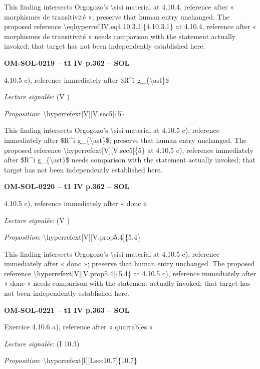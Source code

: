 This finding intersects Orgogozo's \textbackslash{}sisi material at 4.10.4, reference after « morphismes de transitivité »; preserve that human entry unchanged. The proposed reference \textbackslash{}eqhyperref[IV.eq4.10.3.1]\{4.10.3.1\} at 4.10.4, reference after « morphismes de transitivité » needs comparison with the statement actually invoked; that target has not been independently established here.\par
\par\noindent\textbf{OM-SOL-0219 -- t1 IV p.362 -- SOL}\par
4.10.5 c), reference immediately after \$R\textasciicircum{}i g\_\{\textbackslash{}ast\}\$\par
\emph{Lecture signalée}: (V )\par
\emph{Proposition}: \textbackslash{}hyperrefext[V][V.sec5]\{5\}\par
This finding intersects Orgogozo's \textbackslash{}sisi material at 4.10.5 c), reference immediately after \$R\textasciicircum{}i g\_\{\textbackslash{}ast\}\$; preserve that human entry unchanged. The proposed reference \textbackslash{}hyperrefext[V][V.sec5]\{5\} at 4.10.5 c), reference immediately after \$R\textasciicircum{}i g\_\{\textbackslash{}ast\}\$ needs comparison with the statement actually invoked; that target has not been independently established here.\par
\par\noindent\textbf{OM-SOL-0220 -- t1 IV p.362 -- SOL}\par
4.10.5 c), reference immediately after « donc »\par
\emph{Lecture signalée}: (V )\par
\emph{Proposition}: \textbackslash{}hyperrefext[V][V.prop5.4]\{5.4\}\par
This finding intersects Orgogozo's \textbackslash{}sisi material at 4.10.5 c), reference immediately after « donc »; preserve that human entry unchanged. The proposed reference \textbackslash{}hyperrefext[V][V.prop5.4]\{5.4\} at 4.10.5 c), reference immediately after « donc » needs comparison with the statement actually invoked; that target has not been independently established here.\par
\par\noindent\textbf{OM-SOL-0221 -- t1 IV p.363 -- SOL}\par
Exercice 4.10.6 a), reference after « quarrables »\par
\emph{Lecture signalée}: (I 10.3)\par
\emph{Proposition}: \textbackslash{}hyperrefext[I][I.sec10.7]\{10.7\}\par
